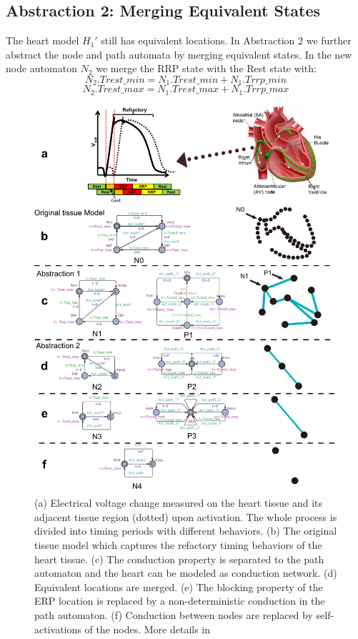 \subsection{Abstraction 2: Merging Equivalent States}
The heart model $H_1'$ still has equivalent locations. In Abstraction 2 we further abstract the node and path automata by merging equivalent states. In the new node automaton $N_2$ we merge the \textsf{RRP} state with the \textsf{Rest} state with:
$$N_2.Trest\_min = N_1.Trest\_min+N_1.Trrp\_min$$
$$N_2.Trest\_max = N_1.Trest\_max+N_1.Trrp\_max$$
\begin{figure}[!h]
\center
\includegraphics[width=\textwidth]{figs/Heart_abs.pdf}
\caption{(a) Electrical voltage change measured on the heart tissue and its adjacent tissue region (dotted) upon activation. The whole process is divided into timing periods with different behaviors. (b) The original tissue model which captures the refactory timing behaviors of the heart tissue. (c) The conduction property is separated to the path automaton and the heart can be modeled as conduction network. (d) Equivalent locations are merged. (e) The blocking property of the ERP location is replaced by a non-deterministic conduction in the path automaton. (f) Conduction between nodes are replaced by self-activations of the nodes. More details in \cite{STTT13}}
\label{fig:HM_abs}
\end{figure} 
